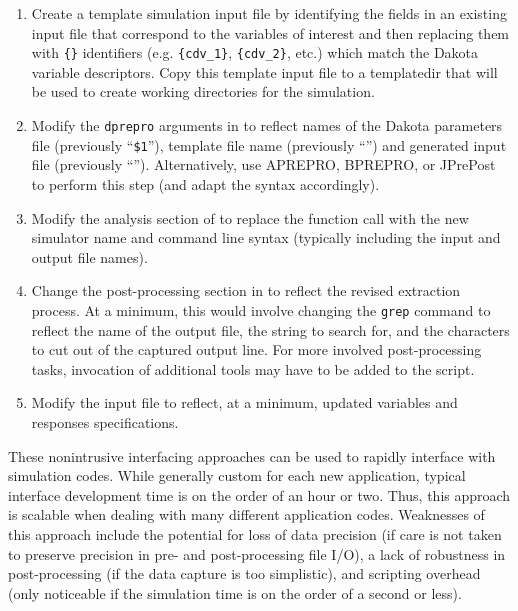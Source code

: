 \begin{enumerate}
\item Create a template simulation input file by identifying the fields
  in an existing input file that correspond to the variables of
  interest and then replacing them with \texttt{\{\}} identifiers
  (e.g. \texttt{\{cdv\_1\}}, \texttt{\{cdv\_2\}}, etc.) which match
  the Dakota variable descriptors. Copy this template input file to a
  templatedir that will be used to create working directories for the
  simulation.

\item Modify the \texttt{dprepro} arguments in
   to reflect names of the Dakota parameters
  file (previously ``\texttt{\$1}''), template file name
  (previously ``'') and generated input file
  (previously ``''). Alternatively, use APREPRO,
  BPREPRO, or JPrePost to perform this step (and adapt the syntax
  accordingly).

\item Modify the analysis section of  to
  replace the  function call with the new
  simulator name and command line syntax (typically including the
  input and output file names).

\item Change the post-processing section in 
  to reflect the revised extraction process. At a minimum, this would
  involve changing the \texttt{grep} command to reflect the name of
  the output file, the string to search for, and the characters to cut
  out of the captured output line. For more involved post-processing
  tasks, invocation of additional tools may have to be added to the
  script.

\item Modify the  input file to reflect,
  at a minimum, updated variables and responses specifications.
\end{enumerate}

These nonintrusive interfacing approaches can be used to rapidly
interface with simulation codes. While generally custom for each new
application, typical interface development time is on the order of an
hour or two. Thus, this approach is scalable when dealing with many
different application codes. Weaknesses of this approach include the
potential for loss of data precision (if care is not taken to preserve
precision in pre- and post-processing file I/O), a lack of robustness
in post-processing (if the data capture is too simplistic), and
scripting overhead (only noticeable if the simulation time is on the
order of a second or less).

